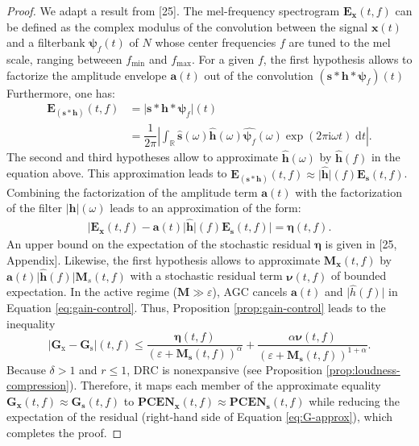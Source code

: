 \documentclass[journal]{IEEEtran}
\theoremstyle{remark}
\begin{document}
\begin{proof}
We adapt a result from [25].
The mel-frequency spectrogram $\mathbf{E}_{\mathbf{x}}(t,f)$ can be defined as the complex modulus of the convolution between the signal $\mathbf{x}(t)$ and a filterbank $\mathbf{\psi}_{f} (t)$ of $N$ whose center frequencies $f$ are tuned to the mel scale, ranging betweeen $f_{\min}$ and $f_{\max}$.
For a given $f$, the first hypothesis allows to factorize the amplitude envelope $\mathbf{a}(t)$ out of the convolution $(\mathbf{s}\ast\mathbf{h}\ast\boldsymbol{\psi}_f)(t)$
Furthermore, one has:
\begin{align}
\mathbf{E}_{(\mathbf{s}\ast\mathbf{h})} (t,f) & =
\vert \mathbf{s} \ast \mathbf{h} \ast \boldsymbol{\psi}_f \vert (t)
\nonumber \\
& = \dfrac{1}{2\pi} \left \vert \int_{\mathbb{R}} \widehat{\mathbf{s}}(\omega) \widehat{\mathbf{h}}(\omega) \widehat{\boldsymbol{\psi}_f}(\omega) \exp(2 \pi \mathrm{i} \omega t) \;\mathrm{d}t \right \vert.
\end{align}
The second and third hypotheses allow to approximate $\widehat{\mathbf{h}}(\omega)$ by $\widehat{\mathbf{h}}(f)$ in the equation above.
This approximation leads to $\mathbf{E}_{(\mathbf{s}\ast\mathbf{h})} (t,f) \approx \vert\widehat{\mathbf{h}}\vert (f) \mathbf{E}_{\mathbf{s}} (t,f)$.
Combining the factorization of the amplitude term $\mathbf{a}(t)$ with the factorization of the filter $\vert\mathbf{h}\vert(\omega)$ leads to an approximation of the form:
\begin{align}
\big\vert \mathbf{E}_\mathbf{x}(t,f) - \mathbf{a}(t) \vert\widehat{\mathbf{h}}\vert(f) \mathbf{E}_\mathbf{s}(t,f) \big\vert = \boldsymbol{\eta}(t,f).
\end{align}
An upper bound on the expectation of the stochastic residual $\boldsymbol{\eta}$ is given in [25, Appendix].
Likewise, the first hypothesis allows to approximate $\mathbf{M}_\mathbf{x}(t,f)$ by $\mathbf{a}(t) \vert \widehat{\mathbf{h}}(f) \vert \mathbf{M}_s(t,f)$ with a stochastic residual term $\mathbf{\nu}(t,f)$ of bounded expectation.
In the active regime ($\mathbf{M}\gg\varepsilon$), AGC cancels $\mathbf{a}(t)$ and $\vert\widehat{h}(f)\vert$ in Equation \ref{eq:gain-control}.
Thus, Proposition \ref{prop:gain-control} leads to the inequality
\begin{equation}
\vert \mathbf{G}_\mathrm{x} - \mathbf{G}_{\mathrm{s}} \vert (t,f)\leq
\dfrac{\boldsymbol{\eta}(t,f)}{(\varepsilon + \mathbf{M}_{\mathbf{s}}(t,f))^\alpha} + \dfrac{\alpha \boldsymbol{\nu}(t,f)}{(\varepsilon+\mathbf{M}_\mathbf{s} (t,f))^{1+\alpha}}.
\label{eq:G-approx}
\end{equation}
Because $\delta > 1$ and $r \leq 1$, DRC is nonexpansive (see Proposition \ref{prop:loudness-compression}).
Therefore, it maps each member of the approximate equality $\mathbf{G}_\mathbf{x} (t,f) \approx \mathbf{G}_\mathbf{s}(t,f)$ to $\mathbf{PCEN}_\mathbf{x} (t,f) \approx \mathbf{PCEN}_\mathbf{s}(t,f)$ while reducing the expectation of the residual (right-hand side of Equation \ref{eq:G-approx}), which completes the proof.
\end{proof}
\end{document}
